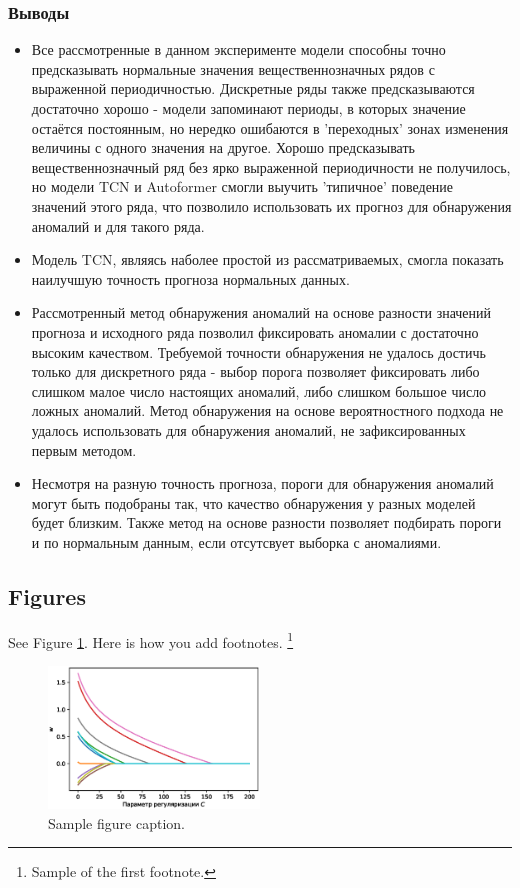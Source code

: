 \documentclass{article}
\begin{document}
\subsubsection{Выводы}
\begin{itemize}
\item Все рассмотренные в данном эксперименте модели способны точно предсказывать нормальные значения вещественнозначных рядов с выраженной периодичностью. Дискретные ряды также предсказываются достаточно хорошо - модели запоминают периоды, в которых значение остаётся постоянным, но нередко ошибаются в 'переходных' зонах изменения величины с одного значения на другое. Хорошо предсказывать вещественнозначный ряд без ярко выраженной периодичности не получилось, но модели TCN и Autoformer смогли выучить 'типичное' поведение значений этого ряда, что позволило использовать их прогноз для обнаружения аномалий и для такого ряда. 

\item Модель TCN, являясь наболее простой из рассматриваемых, смогла показать наилучшую точность прогноза нормальных данных. 

\item Рассмотренный метод обнаружения аномалий на основе разности значений прогноза и исходного ряда позволил фиксировать аномалии с достаточно высоким качеством. Требуемой точности обнаружения не удалось достичь только для дискретного ряда - выбор порога позволяет фиксировать либо слишком малое число настоящих аномалий, либо слишком большое число ложных аномалий. Метод обнаружения на основе вероятностного подхода не удалось использовать для обнаружения аномалий, не зафиксированных первым методом.

\item Несмотря на разную точность прогноза, пороги для обнаружения аномалий могут быть подобраны так, что качество обнаружения у разных моделей будет близким. Также метод на основе разности позволяет подбирать пороги и по нормальным данным, если отсутсвует выборка с аномалиями. 
\end{itemize}


\subsection{Figures}
\lipsum[10]
See Figure \ref{fig:fig1}. Here is how you add footnotes. \footnote{Sample of the first footnote.}
\lipsum[11]

\begin{figure}
	\centering
	\includegraphics[width=0.5\textwidth]{../figures/log_reg_cs_exp.eps}
	\caption{Sample figure caption.}
	\label{fig:fig1}
\end{figure}
\end{document}
